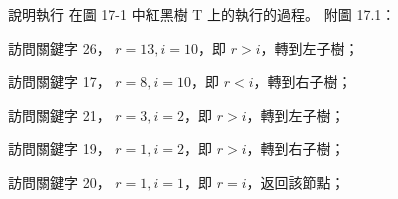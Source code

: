\startEXERCISE
說明執行  在圖 17-1 中紅黑樹 T 上的執行的過程。
附圖 17.1：

\externalfigure[fig17-1-1]
\stopEXERCISE

\startANSWER
\startigBase
\item 訪問關鍵字 26， $r=13,i=10$，即 $r > i$，轉到左子樹；
\item 訪問關鍵字 17， $r= 8,i=10$，即 $r < i$，轉到右子樹；
\item 訪問關鍵字 21， $r= 3,i= 2$，即 $r > i$，轉到左子樹；
\item 訪問關鍵字 19， $r= 1,i= 2$，即 $r > i$，轉到右子樹；
\item 訪問關鍵字 20， $r= 1,i= 1$，即 $r = i$，返回該節點；
\stopigBase
\stopANSWER